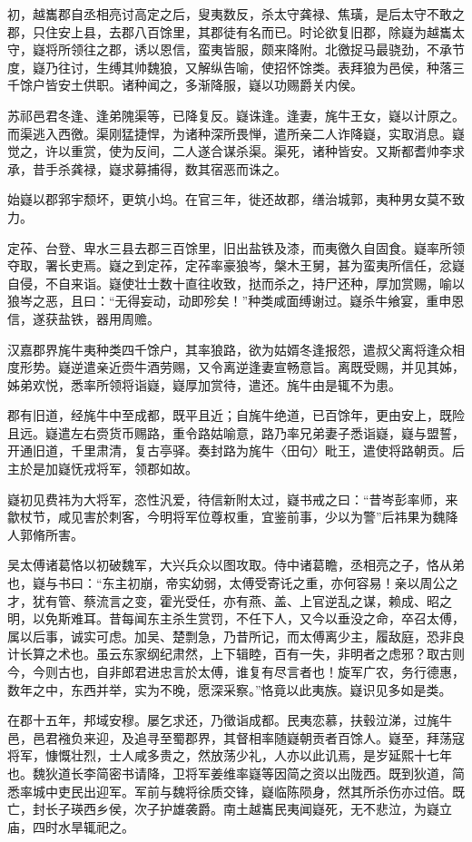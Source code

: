 \documentclass[12pt,UTF8]{ctexbook}
\begin{document}
初，越巂郡自丞相亮讨高定之后，叟夷数反，杀太守龚禄、焦璜，是后太守不敢之郡，只住安上县，去郡八百馀里，其郡徒有名而已。时论欲复旧郡，除嶷为越巂太守，嶷将所领往之郡，诱以恩信，蛮夷皆服，颇来降附。北徼捉马最骁劲，不承节度，嶷乃往讨，生缚其帅魏狼，又解纵告喻，使招怀馀类。表拜狼为邑侯，种落三千馀户皆安土供职。诸种闻之，多渐降服，嶷以功赐爵关内侯。

苏祁邑君冬逢、逢弟隗渠等，已降复反。嶷诛逢。逢妻，旄牛王女，嶷以计原之。而渠逃入西徼。渠刚猛捷悍，为诸种深所畏惮，遣所亲二人诈降嶷，实取消息。嶷觉之，许以重赏，使为反间，二人遂合谋杀渠。渠死，诸种皆安。又斯都耆帅李求承，昔手杀龚禄，嶷求募捕得，数其宿恶而诛之。

始嶷以郡郛宇颓坏，更筑小坞。在官三年，徙还故郡，缮治城郭，夷种男女莫不致力。

定莋、台登、卑水三县去郡三百馀里，旧出盐铁及漆，而夷徼久自固食。嶷率所领夺取，署长吏焉。嶷之到定莋，定莋率豪狼岑，槃木王舅，甚为蛮夷所信任，忿嶷自侵，不自来诣。嶷使壮士数十直往收致，挞而杀之，持尸还种，厚加赏赐，喻以狼岑之恶，且曰：“无得妄动，动即殄矣！”种类咸面缚谢过。嶷杀牛飨宴，重申恩信，遂获盐铁，器用周赡。

汉嘉郡界旄牛夷种类四千馀户，其率狼路，欲为姑婿冬逢报怨，遣叔父离将逢众相度形势。嶷逆遣亲近赍牛酒劳赐，又令离逆逢妻宣畅意旨。离既受赐，并见其姊，姊弟欢悦，悉率所领将诣嶷，嶷厚加赏待，遣还。旄牛由是辄不为患。

郡有旧道，经旄牛中至成都，既平且近；自旄牛绝道，已百馀年，更由安上，既险且远。嶷遣左右赍货币赐路，重令路姑喻意，路乃率兄弟妻子悉诣嶷，嶷与盟誓，开通旧道，千里肃清，复古亭驿。奏封路为旄牛〈田句〉毗王，遣使将路朝贡。后主於是加嶷怃戎将军，领郡如故。

嶷初见费祎为大将军，恣性汎爱，待信新附太过，嶷书戒之曰：“昔岑彭率师，来歙杖节，咸见害於刺客，今明将军位尊权重，宜鉴前事，少以为警”后祎果为魏降人郭脩所害。

吴太傅诸葛恪以初破魏军，大兴兵众以图攻取。侍中诸葛瞻，丞相亮之子，恪从弟也，嶷与书曰：“东主初崩，帝实幼弱，太傅受寄讬之重，亦何容易！亲以周公之才，犹有管、蔡流言之变，霍光受任，亦有燕、盖、上官逆乱之谋，赖成、昭之明，以免斯难耳。昔每闻东主杀生赏罚，不任下人，又今以垂没之命，卒召太傅，属以后事，诚实可虑。加吴、楚剽急，乃昔所记，而太傅离少主，履敌庭，恐非良计长算之术也。虽云东家纲纪肃然，上下辑睦，百有一失，非明者之虑邪？取古则今，今则古也，自非郎君进忠言於太傅，谁复有尽言者也！旋军广农，务行德惠，数年之中，东西并举，实为不晚，愿深采察。”恪竟以此夷族。嶷识见多如是类。

在郡十五年，邦域安穆。屡乞求还，乃徵诣成都。民夷恋慕，扶毂泣涕，过旄牛邑，邑君襁负来迎，及追寻至蜀郡界，其督相率随嶷朝贡者百馀人。嶷至，拜荡寇将军，慷慨壮烈，士人咸多贵之，然放荡少礼，人亦以此讥焉，是岁延熙十七年也。魏狄道长李简密书请降，卫将军姜维率嶷等因简之资以出陇西。既到狄道，简悉率城中吏民出迎军。军前与魏将徐质交锋，嶷临陈陨身，然其所杀伤亦过倍。既亡，封长子瑛西乡侯，次子护雄袭爵。南土越巂民夷闻嶷死，无不悲泣，为嶷立庙，四时水旱辄祀之。
\end{document}

